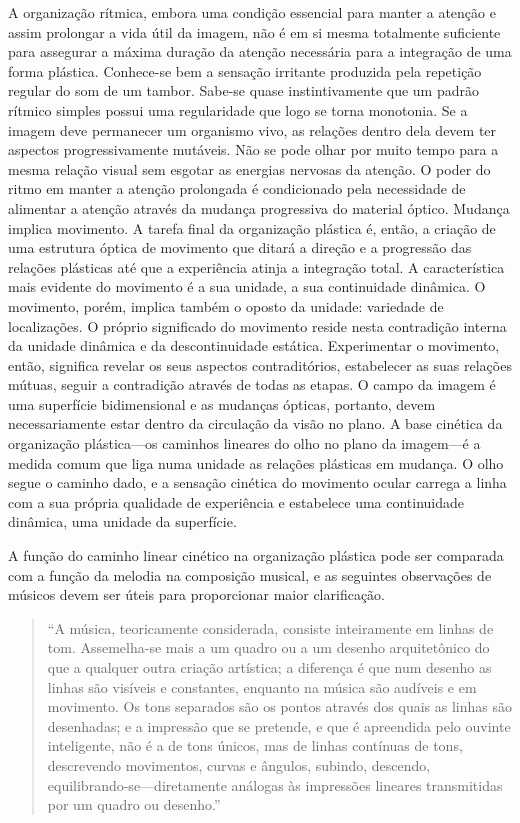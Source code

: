 \documentclass[a4paper]{article}
\begin{document}
A organização rítmica, embora uma condição essencial para manter a atenção e assim prolongar a vida útil da imagem, não é em si mesma totalmente suficiente para assegurar a máxima duração da atenção necessária para a integração de uma forma plástica. Conhece-se bem a sensação irritante produzida pela repetição regular do som de um tambor. Sabe-se quase instintivamente que um padrão rítmico simples possui uma regularidade que logo se torna monotonia. Se a imagem deve permanecer um organismo vivo, as relações dentro dela devem ter aspectos progressivamente mutáveis. Não se pode olhar por muito tempo para a mesma relação visual sem esgotar as energias nervosas da atenção. O poder do ritmo em manter a atenção prolongada é condicionado pela necessidade de alimentar a atenção através da mudança progressiva do material óptico. Mudança implica movimento. A tarefa final da organização plástica é, então, a criação de uma estrutura óptica de movimento que ditará a direção e a progressão das relações plásticas até que a experiência atinja a integração total. A característica mais evidente do movimento é a sua unidade, a sua continuidade dinâmica. O movimento, porém, implica também o oposto da unidade: variedade de localizações. O próprio significado do movimento reside nesta contradição interna da unidade dinâmica e da descontinuidade estática. Experimentar o movimento, então, significa revelar os seus aspectos contraditórios, estabelecer as suas relações mútuas, seguir a contradição através de todas as etapas. O campo da imagem é uma superfície bidimensional e as mudanças ópticas, portanto, devem necessariamente estar dentro da circulação da visão no plano. A base cinética da organização plástica---os caminhos lineares do olho no plano da imagem---é a medida comum que liga numa unidade as relações plásticas em mudança. O olho segue o caminho dado, e a sensação cinética do movimento ocular carrega a linha com a sua própria qualidade de experiência e estabelece uma continuidade dinâmica, uma unidade da superfície.

A função do caminho linear cinético na organização plástica pode ser comparada com a função da melodia na composição musical, e as seguintes observações de músicos devem ser úteis para proporcionar maior clarificação.

\begin{quote}
``A música, teoricamente considerada, consiste inteiramente em linhas de tom. Assemelha-se mais a um quadro ou a um desenho arquitetônico do que a qualquer outra criação artística; a diferença é que num desenho as linhas são visíveis e constantes, enquanto na música são audíveis e em movimento. Os tons separados são os pontos através dos quais as linhas são desenhadas; e a impressão que se pretende, e que é apreendida pelo ouvinte inteligente, não é a de tons únicos, mas de linhas contínuas de tons, descrevendo movimentos, curvas e ângulos, subindo, descendo, equilibrando-se---diretamente análogas às impressões lineares transmitidas por um quadro ou desenho.''
\end{quote}
\end{document}
